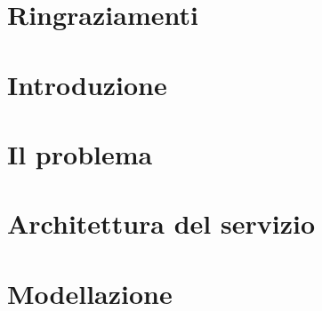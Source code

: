




\cleardoublepage

%


\chapter*{Ringraziamenti}{}
\thispagestyle{empty}
\cleardoublepage

\newpage
\setcounter{page}{1}
\pagestyle{headings}

\renewcommand{\contentsname}{Tabella dei contenuti}
\tableofcontents
\listoffigures
\cleardoublepage

\newpage
\setcounter{page}{1}

\chapter*{Introduzione}
{}

\chapter{Il problema}\label{chapter:introduzione_al_problema}


\chapter{Architettura del servizio}\label{chapter:architettura}


\chapter{Modellazione}\label{chapter:modellazione}


